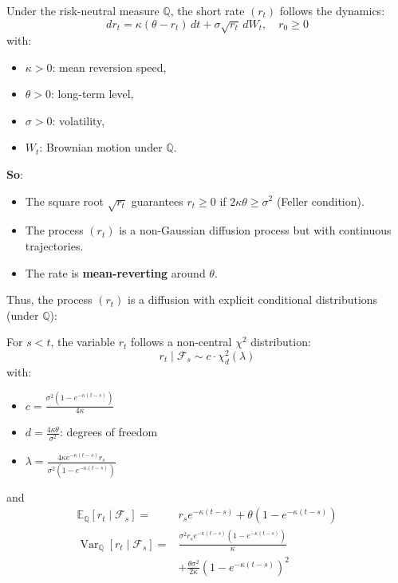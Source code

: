 \begin{f}
	
Under the risk-neutral measure \(\mathbb{Q}\), the short rate \((r_t)\) follows the dynamics:
\[
dr_t = \kappa(\theta - r_t)\,dt + \sigma \sqrt{r_t}\, dW_t, \quad r_0 \geq 0
\]
with:
\begin{itemize}[nosep]
	\item \(\kappa > 0\): mean reversion speed,
	\item \(\theta > 0\): long-term level,
	\item \(\sigma > 0\): volatility,
	\item \(W_t\): Brownian motion under \(\mathbb{Q}\).
\end{itemize}

\textbf{So}:
\begin{itemize}
	\item The square root \(\sqrt{r_t}\) guarantees \(r_t \geq 0\) if \(2\kappa\theta \geq \sigma^2\) (Feller condition).
	\item The process \((r_t)\) is a non-Gaussian diffusion process but with continuous trajectories.
	\item The rate is \textbf{mean-reverting} around \(\theta\).
\end{itemize}

Thus, the process \((r_t)\) is a diffusion with explicit conditional distributions (under \(\mathbb{Q}\)):

For \(s < t\), the variable \(r_t\) follows a non-central \(\chi^2\) distribution:
\[
r_t \mid \mathcal{F}_s \sim c \cdot \chi^2_{d}(\lambda)
\]
with:
\begin{itemize}[nosep]
	\item \(\displaystyle c = \frac{\sigma^2 (1 - e^{-\kappa (t - s)})}{4\kappa}\)
	\item \(\displaystyle d = \frac{4\kappa\theta}{\sigma^2}\): degrees of freedom
	\item \(\displaystyle \lambda = \frac{4\kappa e^{-\kappa (t - s)} r_s}{\sigma^2 (1 - e^{-\kappa (t - s)})}\)
\end{itemize}

and
\[
\begin{aligned}
	\mathbb{E}_\mathbb{Q}[r_t \mid \mathcal{F}_s] =& r_s e^{-\kappa(t-s)} + \theta (1 - e^{-\kappa(t-s)}) \\
	\operatorname{Var}_\mathbb{Q}[r_t \mid \mathcal{F}_s] =& \frac{\sigma^2 r_s e^{-\kappa(t-s)} (1 - e^{-\kappa(t-s)})}{\kappa} \\
			&+ \frac{\theta \sigma^2}{2\kappa} (1 - e^{-\kappa(t-s)})^2
\end{aligned}
\]

\end{f}
